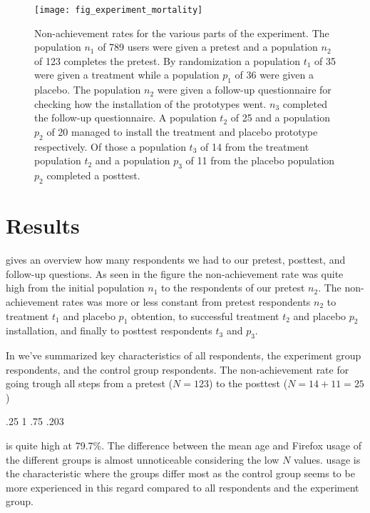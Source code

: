 \begin{figure}
  \begin{whole}
  \texttt{[image: fig\_experiment\_mortality]}
  \caption[Experiment Non-Achievement Rates]{
    Non-achievement rates for the various parts of the experiment.
    The population $n_1$ of 789 \urort{} users were given a pretest and
    a population $n_2$ of 123 completes the pretest.
    By randomization a population $t_1$ of 35 were given a treatment while
    a population $p_1$ of 36 were given a placebo.
    The population $n_2$ were given a follow-up questionnaire for checking
    how the installation of the prototypes went. $n_3$ completed the follow-up
    questionnaire.
    A population $t_2$ of 25 and a population $p_2$ of 20 managed to install
    the treatment and placebo prototype respectively.
    Of those a population $t_3$ of 14 from the treatment population $t_2$ and
    a population $p_3$ of 11 from the placebo population $p_2$ completed
    a posttest.
  }
  \label{figure:fig.experiment.mortality}
  \end{whole}
\end{figure}

\section{Results}

 gives an overview how many respondents we
had to our pretest, posttest, and follow-up questions. As seen in the figure
the non-achievement rate was quite high from the initial population $n_1$ to
the respondents of our pretest $n_2$. The non-achievement
rates was more or less constant from pretest respondents $n_2$ to treatment
$t_1$ and placebo $p_1$ obtention, to successful treatment $t_2$ and placebo
$p_2$ installation, and finally to posttest respondents $t_3$ and $p_3$.

In  we've summarized key characteristics
of all respondents, the experiment group respondents, and the control group
respondents. The non-achievement rate for going trough
all steps from a pretest ($N = 123$) to the posttest ($N = 14 + 11 = 25$)
\begin{sparkline}{3}
  \sparkspike .25  1
  \sparkspike .75  .203
\end{sparkline}
is quite high at 79.7\%. The difference between the mean age and Firefox usage
of the different groups is almost unnoticeable considering the low
$N$ values. \urort{} usage is the characteristic where the groups differ most
as the control group seems to be more experienced in this regard compared to
all respondents and the experiment group.

